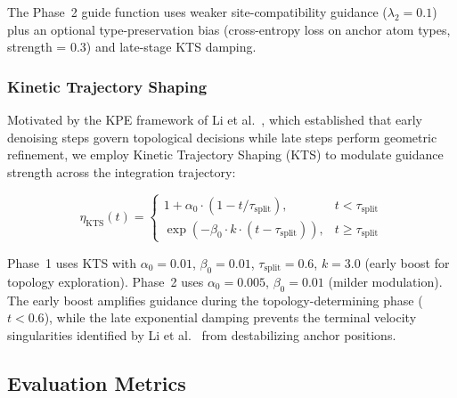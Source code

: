 \documentclass[11pt,letterpaper]{article}
\begin{document}
The Phase~2 guide function uses weaker site-compatibility guidance
($\lambda_2=0.1$) plus an optional type-preservation bias (cross-entropy loss
on anchor atom types, strength = 0.3) and late-stage KTS damping.

\subsubsection{Kinetic Trajectory Shaping}

Motivated by the KPE framework of Li et al.~\cite{li2026kpe}, which established
that early denoising steps govern topological decisions while late steps perform
geometric refinement, we employ Kinetic Trajectory Shaping (KTS) to modulate
guidance strength across the integration trajectory:

\begin{equation}\label{eq:kts}
\eta_{\text{KTS}}(t) = \begin{cases}
  1 + \alpha_0 \cdot (1 - t/\tau_{\text{split}}), & t < \tau_{\text{split}} \\[4pt]
  \exp(-\beta_0 \cdot k \cdot (t - \tau_{\text{split}})), & t \ge \tau_{\text{split}}
\end{cases}
\end{equation}

Phase~1 uses KTS with $\alpha_0=0.01$, $\beta_0=0.01$, $\tau_{\text{split}}=0.6$,
$k=3.0$ (early boost for topology exploration).  Phase~2 uses $\alpha_0=0.005$,
$\beta_0=0.01$ (milder modulation).  The early boost amplifies guidance during
the topology-determining phase ($t < 0.6$), while the late exponential damping
prevents the terminal velocity singularities identified by Li et
al.~\cite{li2026kpe} from destabilizing anchor positions.

\subsection{Evaluation Metrics}
\end{document}
